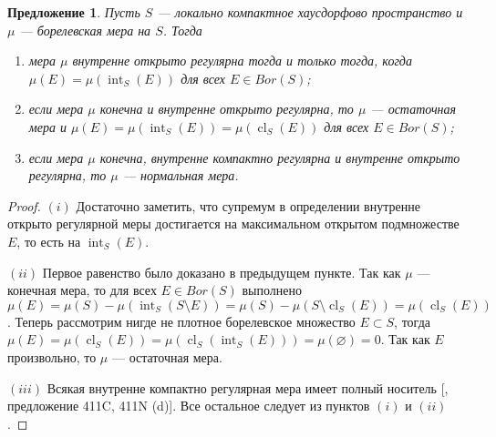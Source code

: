 \documentclass[12pt]{article}
\newtheorem{proposition}[theorem]{Предложение}
\begin{document}
\begin{proposition}\label{InnerOpenRegMeasCharac} Пусть $S$ --- локально
    компактное хаусдорфово пространство и $\mu$ --- борелевская мера на $S$.
    Тогда

    \begin{enumerate}[label = (\roman*)]
        \item мера $\mu$ внутренне открыто регулярна тогда и только тогда, когда
              $\mu(E)=\mu(\operatorname{int}_S(E))$ для всех $E\in Bor(S)$;

        \item если мера $\mu$ конечна и внутренне открыто регулярна, то $\mu$
              --- остаточная мера и
              $\mu(E)=\mu(\operatorname{int}_S(E))=\mu(\operatorname{cl}_S(E))$
              для всех $E\in Bor(S)$;

        \item если мера $\mu$ конечна, внутренне компактно регулярна и внутренне
              открыто регулярна, то $\mu$ --- нормальная мера.
    \end{enumerate}
\end{proposition}
\begin{proof} $(i)$ Достаточно заметить, что супремум в определении внутренне
    открыто регулярной меры достигается на максимальном открытом подмножестве
    $E$, то есть на $\operatorname{int}_S(E)$.

    $(ii)$ Первое равенство было доказано в предыдущем пункте. Так как $\mu$ ---
    конечная мера, то для всех $E\in Bor(S)$ выполнено
    $\mu(E)=\mu(S)-\mu(\operatorname{int}_S(S\setminus E))=\mu(S)-\mu(S\setminus
        \operatorname{cl}_S(E))=\mu(\operatorname{cl}_S(E))$. Теперь рассмотрим
    нигде не плотное борелевское множество $E\subset S$, тогда
    $\mu(E)=\mu(\operatorname{cl}_S(E))
        =\mu(\operatorname{cl}_S(\operatorname{int}_S(E)))=\mu(\varnothing)=0$. Так
    как $E$ произвольно, то $\mu$ --- остаточная мера.

    $(iii)$ Всякая внутренне компактно регулярная мера имеет полный носитель
    [\cite{FremMeasTh4.1}, предложение 411C, 411N (d)]. Все остальное следует из
    пунктов $(i)$ и $(ii)$.
\end{proof}
\end{document}
